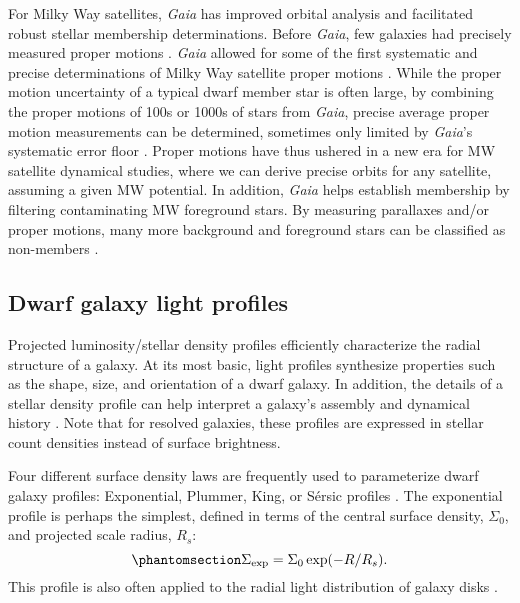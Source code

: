 For Milky Way satellites, \emph{Gaia} has improved orbital analysis and
facilitated robust stellar membership determinations. Before
\emph{Gaia}, few galaxies had precisely measured proper motions
\citep[e.g., using the Hubble Space
Telescope,][]{piatek+2005, sohn+2017}. \emph{Gaia} allowed for some of
the first systematic and precise determinations of Milky Way satellite
proper motions \citep{pace+li2019, MV2020a}. While the proper motion
uncertainty of a typical dwarf member star is often large, by combining
the proper motions of 100s or 1000s of stars from \emph{Gaia}, precise
average proper motion measurements can be determined, sometimes only
limited by \emph{Gaia}'s systematic error floor
\citep[e.g.,][]{MV2020a}. Proper motions have thus ushered in a new era
for MW satellite dynamical studies, where we can derive precise orbits
for any satellite, assuming a given MW potential. In addition,
\emph{Gaia} helps establish membership by filtering contaminating MW
foreground stars. By measuring parallaxes and/or proper motions, many
more background and foreground stars can be classified as non-members
\citep[e.g.,][]{battaglia+2022, jensen+2024}.

\subsection{Dwarf galaxy light profiles}\label{sec:exponential_profiles}

Projected luminosity/stellar density profiles efficiently characterize
the radial structure of a galaxy. At its most basic, light profiles
synthesize properties such as the shape, size, and orientation of a
dwarf galaxy. In addition, the details of a stellar density profile can
help interpret a galaxy's assembly and dynamical history
\citep[e.g.,][]{penarrubia+2009, lee+2018, querci+2025}. Note that for
resolved galaxies, these profiles are expressed in stellar count
densities instead of surface brightness.

Four different surface density laws are frequently used to parameterize
dwarf galaxy profiles: Exponential, Plummer, King, or Sérsic profiles
\citep[e.g.,][]{munoz+2018}. The exponential profile is perhaps the
simplest, defined in terms of the central surface density, \(\Sigma_0\),
and projected scale radius, \(R_s\):
\begin{equation}\protect\phantomsection\label{eq:exponential_law}{
\Sigma_{\rm exp} = \Sigma_0\exp(-R / R_s).
}\end{equation} This profile is also often applied to the radial light
distribution of galaxy disks
\citep{devaucouleurs1959a, freeman1970, kent1985}.

